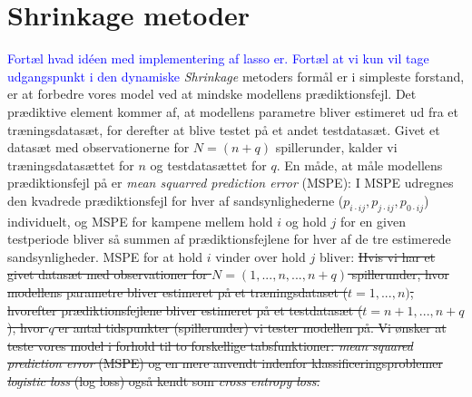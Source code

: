 \documentclass[11pt,a4paper]{article}
\begin{document}
\section{Shrinkage metoder}
\textcolor{blue}{Fortæl hvad idéen med implementering af lasso er. Fortæl at vi kun vil tage udgangspunkt i den dynamiske}
\textit{Shrinkage} metoders formål er i simpleste forstand, er at forbedre vores model ved at mindske modellens prædiktionsfejl. Det prædiktive element kommer af, at modellens parametre bliver estimeret ud fra et træningsdatasæt, for derefter at blive testet på et andet testdatasæt. Givet et datasæt med observationerne for $N=(n+q)$ spillerunder, kalder vi træningsdatasættet for $n$ og testdatasættet for $q$. En måde, at måle modellens prædiktionsfejl på er \textit{mean squarred prediction error} (MSPE): I MSPE udregnes den kvadrede prædiktionsfejl for hver af sandsynlighederne ($p_{i\cdot ij}, p_{j\cdot ij}, p_{0\cdot ij}$) individuelt, og MSPE for kampene mellem hold $i$ og hold $j$ for en given testperiode bliver så summen af prædiktionsfejlene for hver af de tre estimerede sandsynligheder. MSPE for at hold $i$ vinder over hold $j$ bliver:
\sout{Hvis vi har et givet datasæt med observationer for $N=(1,...,n,...,n+q)$ spillerunder, hvor modellens parametre bliver estimeret på et træningsdataset ($t=1,...,n)$, hvorefter prædiktionsfejlene bliver estimeret på et testdatasæt ($t=n+1,...,n+q$), hvor $q$ er antal tidspunkter (spillerunder) vi tester modellen på. Vi ønsker at teste vores model i forhold til to forskellige tabsfunktioner: \textit{mean squared prediction error} (MSPE) og en mere anvendt indenfor klassificeringsproblemer \textit{logistic loss} (log loss) også kendt som \textit{cross entropy loss}. }
\end{document}
